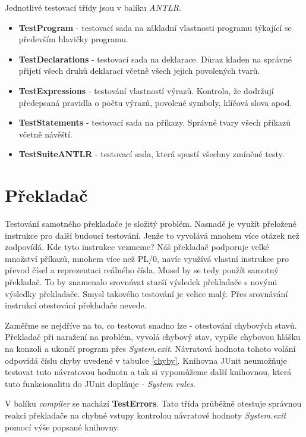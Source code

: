 \documentclass[
12pt,
a4paper,
pdftex,
czech,
titlepage
]{report}
\begin{document}
Jednotlivé testovací třídy jsou v balíku \textit{ANTLR}.
\begin{itemize}
\item \textbf{TestProgram} - testovací sada na základní vlastnosti programu týkající se především hlavičky programu.
\item \textbf{TestDeclarations} - testovací sada na deklarace. Důraz kladen na správné přijetí všech druhů deklarací včetně všech jejich povolených tvarů.
\item \textbf{TestExpressions} - testování vlastností výrazů. Kontrola, že dodržují předepsaná pravidla o počtu výrazů, povolené symboly, klíčová slova apod.
\item \textbf{TestStatements} - testovací sada na příkazy. Správné tvary všech příkazů včetně návěští.
\item \textbf{TestSuiteANTLR} - testovací sada, která spustí všechny zmíněné testy.
\end{itemize} 

\section{Překladač}

Testování samotného překladače je složitý problém. Nasnadě je využít přeložené instrukce pro další budoucí testování. Jenže to vyvolává mnohem více otázek než zodpovídá. Kde tyto instrukce vezmeme? Náš překladač podporuje velké množství příkazů, mnohem více než PL/0, navíc využívá vlastní instrukce pro převod čísel a reprezentaci reálného čísla. Musel by se tedy použít samotný překladač. To by znamenalo srovnávat starší výsledek překladače s novými výsledky překladače. Smysl takového testování je velice malý. Přes srovnávání instrukcí otestování překladače nevede. 

Zaměřme se nejdříve na to, co testovat snadno lze - otestování chybových stavů. Překladač při naražení na problém, vyvolá chybový stav, vypíše chybovou hlášku na konzoli a ukončí program přes \textit{System.exit}. Návratová hodnota tohoto volání odpovídá číslu chyby uvedené v tabulce \ref{chyby}. Knihovna JUnit neumožňuje testovat tuto návratovou hodnotu a tak si vypomůžeme další knihovnou, která tuto funkcionalitu do JUnit doplňuje - \textit{System rules}. 

V balíku \textit{compiler} se nachází \textbf{TestErrors}. Tato třída průběžně otestuje správnou reakci překladače na chybné vstupy kontrolou návratové hodnoty \textit{System.exit} pomocí výše popsané knihovny.
\end{document}

